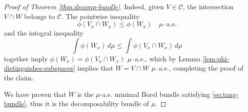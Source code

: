 \documentclass[10pt,a4paper]{amsart}
\begin{document}
\begin{proof}[Proof of Theorem \ref{thm:decomp-bundle}]
Indeed, given $V \in \mathcal C$, the intersection $V \cap W$ belongs to $\mathcal C$. The pointwise inequality
\[
\phi(V_x \cap W_x) \le  \phi(W_x) \quad \mu\text{–a.e.}
\]
and the integral inequality
\[
\int \phi(W_x)\, d\mu \le \int \phi(V_x \cap W_x)\, d\mu
\]
together imply $\phi(W_x) = \phi(V_x \cap W_x)$ $\mu$–a.e., which by Lemma \ref{lem:phi-distinguishes-subspaces} implies that $W = V \cap W$ $\mu$–a.e., completing the proof of the claim. 

We have proven that $W$ is the $\mu$-a.e. minimal Borel bundle satisfying \eqref{eq:tang-bundle}, thus it is the decomposability bundle of $\mu$.
\end{proof}
\end{document}
